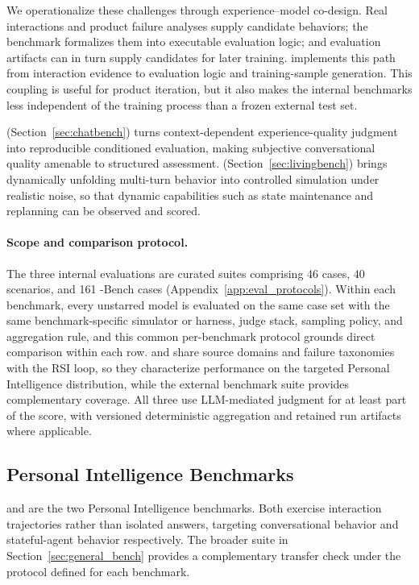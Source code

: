 We operationalize these challenges through experience--model co-design. Real interactions and product failure analyses supply candidate behaviors; the benchmark formalizes them into executable evaluation logic; and evaluation artifacts can in turn supply candidates for later training. \macaron{} implements this path from interaction evidence to evaluation logic and training-sample generation. This coupling is useful for product iteration, but it also makes the internal benchmarks less independent of the training process than a frozen external test set.

\chatbench{} (Section~\ref{sec:chatbench}) turns context-dependent experience-quality judgment into reproducible conditioned evaluation, making subjective conversational quality amenable to structured assessment. \livingbench{} (Section~\ref{sec:livingbench}) brings dynamically unfolding multi-turn behavior into controlled simulation under realistic noise, so that dynamic capabilities such as state maintenance and replanning can be observed and scored.

\paragraph{Scope and comparison protocol.}
The three internal evaluations are curated suites comprising 46 \chatbench{} cases, 40 \livingbench{} scenarios, and 161 \uifora{}-Bench cases (Appendix~\ref{app:eval_protocols}). Within each benchmark, every unstarred model is evaluated on the same case set with the same benchmark-specific simulator or harness, judge stack, sampling policy, and aggregation rule, and this common per-benchmark protocol grounds direct comparison within each row. \chatbench{} and \livingbench{} share source domains and failure taxonomies with the RSI loop, so they characterize performance on the targeted Personal Intelligence distribution, while the external benchmark suite provides complementary coverage. All three use LLM-mediated judgment for at least part of the score, with versioned deterministic aggregation and retained run artifacts where applicable.


\subsection{Personal Intelligence Benchmarks}
\label{sec:pi_benchmarks}

\chatbench{} and \livingbench{} are the two Personal Intelligence benchmarks. Both exercise interaction trajectories rather than isolated answers, targeting conversational behavior and stateful-agent behavior respectively. The broader suite in Section~\ref{sec:general_bench} provides a complementary transfer check under the protocol defined for each benchmark.

